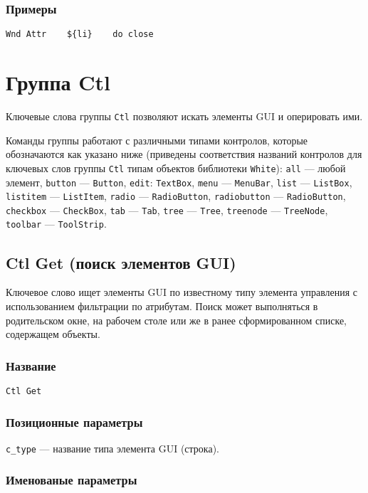 \documentclass[11pt]{book} %
\begin{document}
\subsubsection*{Примеры}
\begin{verbatim}Wnd Attr    ${li}    do close\end{verbatim}



\section{Группа Ctl}
Ключевые слова группы \verb"Ctl" позволяют искать элементы GUI и оперировать ими.

Команды группы работают с различными типами контролов, которые обозначаются как указано ниже (приведены соответствия названий контролов для ключевых слов группы \verb|Ctl| типам объектов библиотеки \verb|White|): \verb'all' --- любой элемент, \verb'button' --- \verb'Button', \verb'edit': \verb'TextBox', \verb'menu' --- \verb'MenuBar', \verb'list' --- \verb'ListBox', \verb'listitem' --- \verb'ListItem', \verb'radio' --- \verb'RadioButton', \verb'radiobutton' --- \verb'RadioButton', \verb'checkbox' --- \verb'CheckBox', \verb'tab' --- \verb'Tab', \verb'tree' --- \verb'Tree', \verb'treenode' --- \verb'TreeNode', \verb'toolbar' --- \verb'ToolStrip'.

\subsection{Ctl Get (поиск элементов GUI)}

Ключевое слово ищет элементы GUI по известному типу элемента управления с использованием фильтрации по атрибутам. Поиск может выполняться в родительском окне, на рабочем столе или же в ранее сформированном списке, содержащем объекты.


\subsubsection*{Название} 
\verb"Ctl Get"

\subsubsection*{Позиционные параметры} 

\verb|c_type| --- название типа элемента GUI (строка).

\subsubsection*{Именованые параметры}
\end{document}
